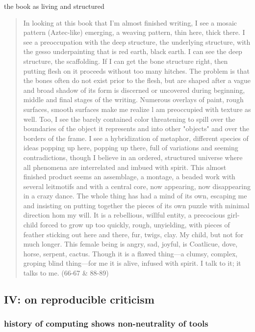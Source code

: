 \documentclass[11pt]{article}
\begin{document}
the book as living and structured
\begin{quote}
In looking at this book that I’m almost finished writing, I see a
mosaic pattern (Aztec-like) emerging, a weaving pattern, thin here,
thick there. I see a preoccupation with the deep structure, the
underlying structure, with the gesso underpainting that is red earth,
black earth. I can see the deep structure, the scaffolding. If I can
get the bone structure right, then putting flesh on it proceeds
without too many hitches. The problem is that the bones often do not
exist prior to the flesh, but are shaped after a vague and broad
shadow of its form is discerned or uncovered during beginning, middle
and final stages of the writing. Numerous overlays of paint, rough
surfaces, smooth surfaces make me realize l am preoccupied with
texture as well. Too, I see the barely contained color threatening to
spill over the boundaries of the object it represents and into other
"objects" and over the borders of the frame. I see a hybridization of
metaphor, different species of ideas popping up here, popping up
there, full of variations and seeming contradictions, though I believe
in an ordered, structured universe where all phenomena are
interrelated and imbued with spirit. This almost finished product
seems an assemblage, a montage, a beaded work with several leitmotifs
and with a central core, now appearing, now disappearing in a crazy
dance. The whole thing has had a mind of its own, escaping me and
insisting on putting together the pieces of its own puzzle with
minimal direction hom my will. It is a rebellious, willful entity, a
precocious girl-child forced to grow up too quickly, rough,
unyielding, with pieces of feather sticking out here and there, fur,
twigs, clay. My child, but not for much longer. This female being is
angry, sad, joyful, is Coatlicue, dove, horse, serpent, cactus. Though
it is a flawed thing---a clumsy, complex, groping blind thing---for me
it is alive, infused with spirit. I talk to it; it talks to me. (66-67
\& 88-89)
\end{quote}




\subsection{IV: on reproducible criticism}
\label{sec:org76bdb56}
\subsubsection{history of computing shows non-neutrality of tools}
\label{sec:orgb0bb0b6}
\end{document}
